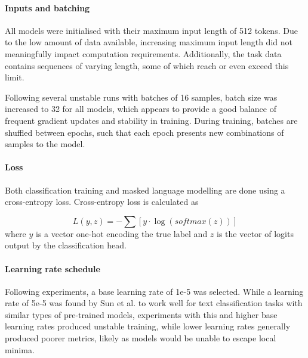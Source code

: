 \documentclass[12pt]{report}
\begin{document}
\paragraph*{Inputs and batching}
All models were initialised with their maximum input length of 512 tokens.
Due to the low amount of data available, increasing maximum input length did not meaningfully impact computation requirements.
Additionally, the task data contains sequences of varying length, some of which reach or even exceed this limit.

Following several unstable runs with batches of 16 samples, batch size was increased to 32 for all models, which appears to provide a good balance of frequent gradient updates and stability in training.
During training, batches are shuffled between epochs, such that each epoch presents new combinations of samples to the model.

\paragraph*{Loss}
Both classification training and masked language modelling are done using a cross-entropy loss.
Cross-entropy loss is calculated as

$$L(y, z) = -\sum\left[y \cdot \log(softmax(z))\right]$$
where $y$ is a vector one-hot encoding the true label and $z$ is the vector of logits output by the classification head.

\paragraph*{Learning rate schedule}
Following experiments, a base learning rate of 1e-5 was selected.
While a learning rate of 5e-5 was found by Sun et al. \citeyear{Sun2020} to work well for text classification tasks with similar types of pre-trained models, experiments with this and higher base learning rates produced unstable training, while lower learning rates generally produced poorer metrics, likely as models would be unable to escape local minima.
\end{document}
